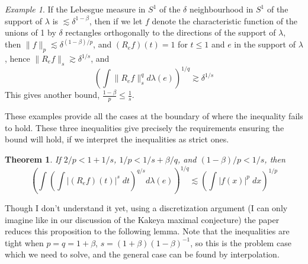 \documentclass{article}
\theoremstyle{plain}
\newtheorem{theorem}{Theorem}
\theoremstyle{remark}
\newtheorem*{example}{Example}
\theoremstyle{definition}
\begin{document}
\begin{example}
	If the Lebesgue measure in $S^1$ of the $\delta$ neighbourhood in $S^1$ of the support of $\lambda$ is $\lesssim \delta^{1-\beta}$, then if we let $f$ denote the characteristic function of the unions of 1 by $\delta$ rectangles orthogonally to the directions of the support of $\lambda$, then $\| f \|_p \lesssim \delta^{(1 - \beta)/p}$, and $(R_e f)(t) = 1$ for $t \leq 1$ and $e$ in the support of $\lambda$, hence $\| R_e f \|_s \gtrsim \delta^{1/s}$, and
	\[ \left( \int \| R_e f \|_s^q d\lambda(e) \right)^{1/q} \gtrsim \delta^{1/s} \]
	This gives another bound, $\frac{1 - \beta}{p} \leq \frac{1}{s}$.
\end{example}

These examples provide all the cases at the boundary of where the inequality fails to hold. These three inequalities give precisely the requirements ensuring the bound will hold, if we interpret the inequalities as strict ones.

\begin{theorem}
	If $2/p < 1 + 1/s$, $1/p < 1/s + \beta/q$, and $(1-\beta)/p < 1/s$, then
	\[ \left( \int \left( \int |(R_e f)(t)|^s\; dt \right)^{q/s} d\lambda(e) \right)^{1/q} \lesssim \left( \int |f(x)|^p\; dx \right)^{1/p} \]
\end{theorem}

Though I don't understand it yet, using a discretization argument (I can only imagine like in our discussion of the Kakeya maximal conjecture) the paper reduces this proposition to the following lemma. Note that the inequalities are tight when $p = q = 1 + \beta$, $s = (1 + \beta)(1 - \beta)^{-1}$, so this is the problem case which we need to solve, and the general case can be found by interpolation.
\end{document}
